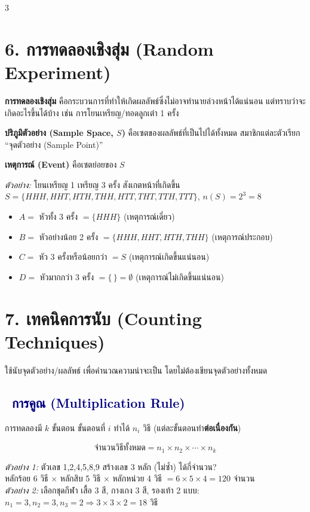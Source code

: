 \documentclass[9pt]{extarticle}
\newcommand{\dist}[1]{\subsection*{\textcolor{navy}{\textbullet\ #1}}}
\begin{document}
\begin{multicols}{3}
\raggedcolumns

\section*{6. การทดลองเชิงสุ่ม (Random Experiment)}
\textbf{การทดลองเชิงสุ่ม} คือกระบวนการที่ทำให้เกิดผลลัพธ์ซึ่งไม่อาจทำนายล่วงหน้าได้แน่นอน แต่ทราบว่าจะเกิดอะไรขึ้นได้บ้าง เช่น การโยนเหรียญ/ทอดลูกเต๋า 1 ครั้ง

\textbf{ปริภูมิตัวอย่าง (Sample Space, $S$)} คือเซตของผลลัพธ์ที่เป็นไปได้ทั้งหมด สมาชิกแต่ละตัวเรียก ``จุดตัวอย่าง (Sample Point)''

\textbf{เหตุการณ์ (Event)} คือเซตย่อยของ $S$

\begin{solbox}
\textit{ตัวอย่าง:} โยนเหรียญ 1 เหรียญ 3 ครั้ง สังเกตหน้าที่เกิดขึ้น\\
$S=\{HHH,HHT,HTH,THH,HTT,THT,TTH,TTT\}$, $n(S)=2^3=8$
\begin{itemize}
\item $A=$ หัวทั้ง 3 ครั้ง $=\{HHH\}$ (เหตุการณ์เดี่ยว)
\item $B=$ หัวอย่างน้อย 2 ครั้ง $=\{HHH,HHT,HTH,THH\}$ (เหตุการณ์ประกอบ)
\item $C=$ หัว 3 ครั้งหรือน้อยกว่า $=S$ (เหตุการณ์เกิดขึ้นแน่นอน)
\item $D=$ หัวมากกว่า 3 ครั้ง $=\{\,\}=\emptyset$ (เหตุการณ์ไม่เกิดขึ้นแน่นอน)
\end{itemize}
\end{solbox}

\section*{7. เทคนิคการนับ (Counting Techniques)}
ใช้นับจุดตัวอย่าง/ผลลัพธ์ เพื่อคำนวณความน่าจะเป็น โดยไม่ต้องเขียนจุดตัวอย่างทั้งหมด

\dist{การคูณ (Multiplication Rule)}
การทดลองมี $k$ ขั้นตอน ขั้นตอนที่ $i$ ทำได้ $n_i$ วิธี (แต่ละขั้นตอนทำ\textbf{ต่อเนื่องกัน})
\begin{formulabox}
$$\text{จำนวนวิธีทั้งหมด}=n_1\times n_2\times\cdots\times n_k$$
\end{formulabox}
\begin{solbox}
\textit{ตัวอย่าง 1:} ตัวเลข 1,2,4,5,8,9 สร้างเลข 3 หลัก (ไม่ซ้ำ) ได้กี่จำนวน?\\
หลักร้อย 6 วิธี $\times$ หลักสิบ 5 วิธี $\times$ หลักหน่วย 4 วิธี $=6{\times}5{\times}4=120$ จำนวน\\[3pt]
\textit{ตัวอย่าง 2:} เลือกชุดกีฬา เสื้อ 3 สี, กางเกง 3 สี, รองเท้า 2 แบบ:\\
$n_1{=}3,n_2{=}3,n_3{=}2\Rightarrow3{\times}3{\times}2=18$ วิธี
\end{solbox}


\end{multicols}
\end{document}
